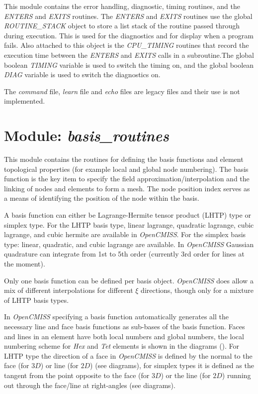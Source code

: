This module contains the error handling, diagnostic, timing routines, and 
the \emph{ENTERS} and \emph{EXITS} routines. The \emph{ENTERS} and 
\emph{EXITS} routines use the global \emph{ROUTINE\_STACK} object to store 
a list stack of the routine passed through during execution. This is used 
for the diagnostics and for display when a program fails. Also attached to 
this object is the \emph{CPU\_TIMING} routines that record the execution time 
between the \emph{ENTERS} and \emph{EXITS} calls in a subroutine.The global 
boolean \emph{TIMING} variable is used to switch the timing on, and the global 
boolean \emph{DIAG} variable is used to switch the diagnostics on. 

The \emph{command} file, \emph{learn} file and \emph{echo} files are legacy 
files and their use is not implemented.


\section{Module: \emph{basis\_routines}}
\label{sec:basisroutines}

This module contains the routines for defining the basis functions and element 
topological properties (for example local and global node numbering). The basis 
function is the key item to specify the field approximation/interpolation and 
the linking of nodes and elements to form a mesh. The node position index 
serves as a means of identifying the position of the node within the basis.

A basis function can either be Lagrange-Hermite tensor product (LHTP) type or 
simplex type. For the LHTP basis type, linear lagrange, quadratic lagrange, 
cubic lagrange, and cubic hermite are available in \emph{OpenCMISS}. For the 
simplex basis type: linear, quadratic, and cubic lagrange are available. In 
\emph{OpenCMISS} Gaussian quadrature can integrate from 1st to 5th order 
(currently 3rd order for lines at the moment). 

Only one basis function can be defined per basis object. \emph{OpenCMISS} does 
allow a mix of different interpolations for different $\xi$ directions, though 
only for a mixture of LHTP basis types. 

In \emph{OpenCMISS} specifying a basis function automatically generates all the 
necessary line and face basis functions as sub-bases of the basis function. 
Faces and lines in an element have both local numbers and global numbers, the 
local numbering scheme for \emph{Hex} and \emph{Tet} elements is shown in the 
diagrams (). For LHTP type the direction of a face in \emph{OpenCMISS} is
defined by the normal to the face (for $3D$) or line (for $2D$) (see diagrams), 
for simplex types it is defined as the tangent from the point opposite to the 
face (for $3D$) or the line (for $2D$) running out through the face/line at 
right-angles (see diagrams).


